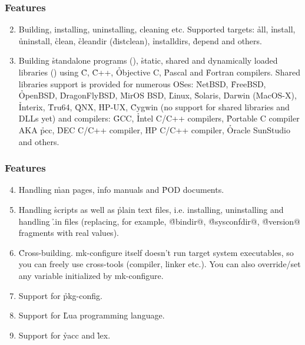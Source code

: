 \documentclass[hyperref={colorlinks=true}]{beamer}
\begin{document}
\begin{frame}[fragile,t]
  \frametitle{Features}
  \begin{block}{}
  \begin{enumerate}
  \setcounter{enumi}{1}
  \item Building, installing, uninstalling, cleaning
    etc. Supported targets: \h{all}, \h{install},
    \h{uninstall},
    \h{clean}, \h{cleandir} (\h{distclean}), \h{installdirs}, \h{depend}
    and others.
  \item Building \h{standalone programs} (),
    \h{static, shared and dynamically loaded libraries}
    () using \h{C},
    \h{C++}, \h{Objective C}, \h{Pascal} and \h{Fortran} compilers.
    Shared libraries
    support is provided for numerous OSes: \h{NetBSD}, \h{FreeBSD},
    \h{OpenBSD},
    \h{DragonFlyBSD}, \h{MirOS BSD}, \h{Linux}, \h{Solaris}, \h{Darwin}
    (MacOS-X), \h{Interix}, \h{Tru64},
    \h{QNX}, \h{HP-UX}, \h{Cygwin} (no support for shared libraries
    and DLLs yet) and
    compilers: \h{GCC}, \h{Intel C/C++} compilers, \h{Portable C compiler} AKA
    \h{pcc}, \h{DEC C/C++ compiler}, \h{HP C/C++ compiler},
    \h{Oracle SunStudio} and others.
  \end{enumerate}
  \end{block}
\end{frame}


\begin{frame}[fragile,t]
  \frametitle{Features}
  \begin{block}{}
  \begin{enumerate}
  \setcounter{enumi}{3}
  \item Handling \h{man} pages, \h{info} manuals and \h{POD} documents.
  \item Handling \h{scripts} as well as \h{plain text files},
    i.e. installing, uninstalling and handling \h{.in files}
    (replacing, for example, \h{@bindir@}, \h{@sysconfdir@}, \h{@version@}
    fragments with real values).
  \item \h{Cross-building}. mk-configure itself doesn't run
    target system
    executables, so you can freely use cross-tools (compiler, linker
    etc.).  You can also override/set any variable initialized by mk-configure.
  \item Support for \h{pkg-config}.
  \item Support for \h{Lua} programming language.
  \item Support for \h{yacc} and \h{lex}.
  \end{enumerate}
  \end{block}
\end{frame}
\end{document}
